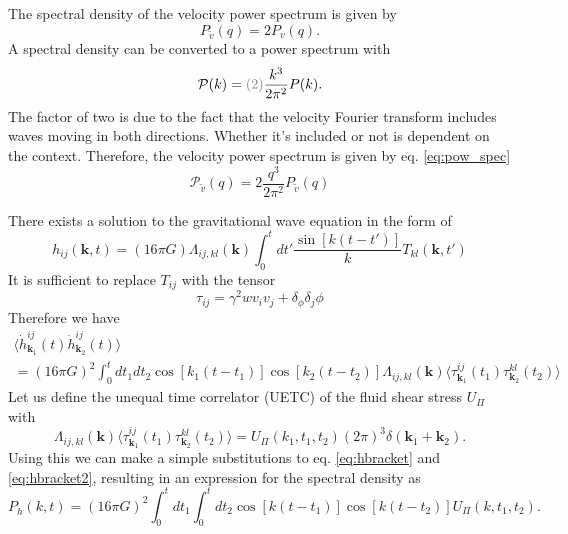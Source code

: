 The spectral density of the velocity power spectrum is given by
\begin{equation}
P_{\tilde{v}} (q) = 2 P_v (q).
\end{equation}
A spectral density can be converted to a power spectrum with
\begin{equation}
\mathcal{P}(k) = \textcolor{gray}{(2)} \frac{k^3}{2 \pi^2} P(k).
\label{eq:pow_spec}
\end{equation}
The factor of two is due to the fact that the velocity Fourier transform includes waves moving in both directions.
Whether it's included or not is dependent on the context.
Therefore, the velocity power spectrum is given by eq. \eqref{eq:pow_spec} \cite[eq. 4.18]{hindmarsh_gw_pt_2019}
\begin{equation}
\mathcal{P}_{\tilde{v}} (q) = 2 \frac{q^3}{2\pi^2} P_{\tilde{v}} (q)
\label{eq:pow_v}
\end{equation}

There exists a solution to the gravitational wave equation in the form of
\begin{equation}
h_{ij} (\bm{k},t) = (16 \pi G) \Lambda_{ij,kl}(\bm{k}) \int_0^t dt' \frac{\sin [k(t-t')]}{k} T_{kl}(\bm{k},t')
\end{equation}
It is sufficient to replace $T_{ij}$ with the tensor
\begin{equation}
\tau_{ij} = \gamma^2 w v_i v_j + \delta_ \phi \delta_j \phi
\end{equation}
Therefore we have
\begin{multline}
\langle \dot{h}_{\bm{k}_1}^{ij}(t) \dot{h}_{\bm{k}_2}^{ij}(t) \rangle \\
= (16 \pi G)^2 \int_0^t dt_1 dt_2 \cos [k_1(t-t_1)] \cos [k_2(t-t_2)] \Lambda_{ij,kl}(\bm{k})
\langle \tau_{\bm{k}_1}^{ij}(t_1) \tau_{\bm{k}_2}^{kl}(t_2) \rangle
\end{multline}
Let us define the unequal time correlator (UETC) of the fluid shear stress $U_\Pi$ with
\begin{equation}
\Lambda_{ij,kl}(\bm{k}) \langle \tau_{\bm{k}_1}^{ij}(t_1) \tau_{\bm{k}_2}^{kl}(t_2) \rangle
= U_\Pi (k_1, t_1, t_2) (2 \pi)^3 \delta(\bm{k}_1 + \bm{k}_2).
\label{eq:hbracket2}
\end{equation}
Using this we can make a simple substitutions to eq. \eqref{eq:hbracket} and \eqref{eq:hbracket2},
resulting in an expression for the spectral density as
\begin{equation}
P_{\dot{h}} (k,t) = (16 \pi G)^2 \int_0^t dt_1 \int_0^t dt_2 \cos [k(t-t_1)] \cos [k(t-t_2)] U_\Pi (k, t_1, t_2).
\end{equation}


